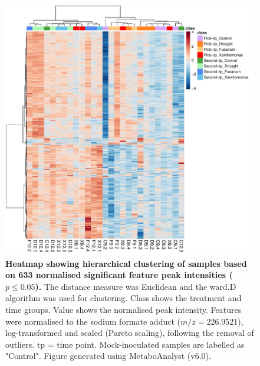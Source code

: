 \begin{figure}[hp!]
  \centering
  \includegraphics[width=\textwidth]{Figures/Sig633FeaturesRedSamplesRedGroups_ForThesis.pdf}
  \caption[Heatmap showing hierarchical clustering of samples based on 633 normalised significant feature peak intensities ($p \le0.05$).]{\textbf{Heatmap showing hierarchical clustering of samples based on 633 normalised significant feature peak intensities ($p \le0.05$).} The distance measure was Euclidean and the ward.D algorithm was used for clustering. Class shows the treatment and time groups. Value shows the normalised peak intensity. Features were normalised to the sodium formate   adduct ($m/z=226.9521$), log-transformed and scaled (Pareto scaling), following the removal of outliers. tp = time point. Mock-inoculated samples are labelled as "Control". Figure generated using MetaboAnalyst (v6.0).}
  \label{fig:Sig657FeaturesRedSamples}
\end{figure}


